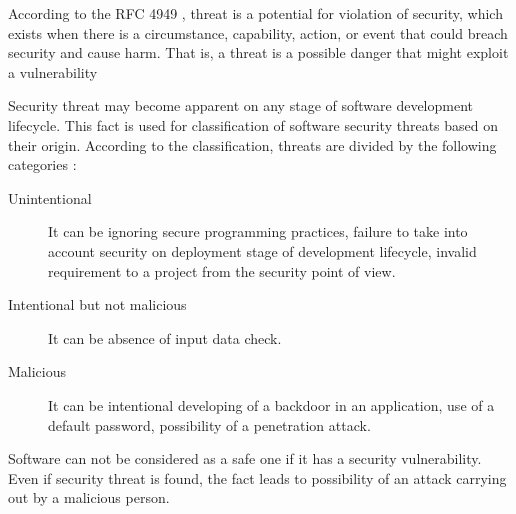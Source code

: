 %
According to the RFC 4949 , threat is a potential for violation of security, which exists when there is a circumstance, capability, action, or event that could breach security and cause harm. 
%
That is, a threat is a possible danger that might exploit a vulnerability

%
Security threat may become apparent on any stage of software development lifecycle. 
%
This fact is used for classification of software security threats based on their origin. 
%
According to the classification, threats are divided by the following categories : 
\begin{description}
	\item[Unintentional] It can be ignoring secure programming practices, failure to take into account security on deployment stage of development lifecycle, invalid requirement to a project from the security point of view. 
	\item[Intentional but not malicious] It can be absence of input data check.
	\item[Malicious] It can be intentional developing of a backdoor in an application, use of a default password, possibility of a penetration attack. 
\end{description}

%
Software can not be considered as a safe one if it has a security vulnerability. 
%
Even if security threat is found, the fact leads to possibility of an attack carrying out by a malicious person. 